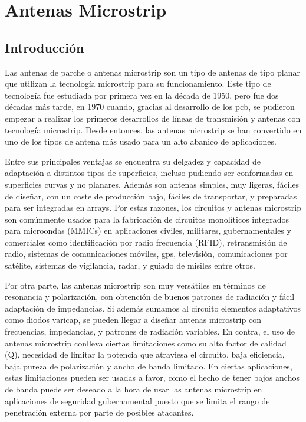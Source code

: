 
\chapter{Antenas Microstrip}
\label{objetivos}

\section{Introducción}
\par Las antenas de parche o antenas microstrip son un tipo de antenas de tipo planar que utilizan la tecnología microstrip para su funcionamiento. Este tipo de tecnología fue estudiada por primera vez en la década de 1950, pero fue dos décadas más tarde, en 1970 cuando, gracias al desarrollo de los \gls{pcb}, se pudieron empezar a realizar los primeros desarrollos de líneas de transmisión y antenas con tecnología microstrip. Desde entonces, las antenas microstrip se han convertido en uno de los tipos de antena más usado para un alto abanico de aplicaciones. 
\\
\par Entre sus principales ventajas se encuentra su delgadez y capacidad de adaptación a distintos tipos de superficies, incluso pudiendo ser conformadas en superficies curvas y no planares. Además son antenas simples, muy ligeras, fáciles de diseñar, con un coste de producción bajo, fáciles de transportar, y preparadas para ser integradas en arrays. Por estas razones, los circuitos y antenas microstrip son comúnmente usados para la fabricación de circuitos monolíticos integrados para microondas (MMICs) en aplicaciones civiles, militares, gubernamentales y comerciales como identificación por radio frecuencia (RFID), retransmisión de radio, sistemas de comunicaciones móviles, \gls{gps}, televisión, comunicaciones por satélite, sistemas de vigilancia, radar, y guiado de misiles entre otros. 
\\
\par Por otra parte, las antenas microstrip son muy versátiles en términos de resonancia y polarización, con obtención de buenos patrones de radiación y fácil adaptación de impedancias. Si además sumamos al circuito elementos adaptativos como diodos varicap, se pueden llegar a diseñar antenas microstrip con frecuencias, impedancias, y patrones de radiación variables. En contra, el uso de antenas microstrip conlleva ciertas limitaciones como su alto factor de calidad (Q), necesidad de limitar la potencia que atraviesa el circuito, baja eficiencia, baja pureza de polarización y ancho de banda limitado. En ciertas aplicaciones, estas limitaciones pueden ser usadas a favor, como el hecho de tener bajos anchos de banda puede ser deseado a la hora de usar las antenas microstrip en aplicaciones de seguridad gubernamental puesto que se limita el rango de penetración externa por parte de posibles atacantes.









